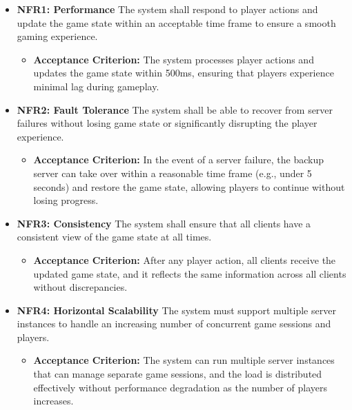 \documentclass{scrartcl}
\begin{document}
%
\begin{itemize}
  \item \textbf{NFR1: Performance} \newline
  The system shall respond to player actions and update the game state within an acceptable time frame to ensure a smooth gaming experience.
  \begin{itemize}
    \item \textbf{Acceptance Criterion:} The system processes player actions and updates the game state within 500ms, ensuring that players experience minimal lag during gameplay.
  \end{itemize}

  \item \textbf{NFR2: Fault Tolerance} \newline
  The system shall be able to recover from server failures without losing game state or significantly disrupting the player experience.
  \begin{itemize}
    \item \textbf{Acceptance Criterion:} In the event of a server failure, the backup server can take over within a reasonable time frame (e.g., under 5 seconds) and restore the game state, allowing players to continue without losing progress.
  \end{itemize}

  \item \textbf{NFR3: Consistency} \newline
  The system shall ensure that all clients have a consistent view of the game state at all times.
  \begin{itemize}
    \item \textbf{Acceptance Criterion:} After any player action, all clients receive the updated game state, and it reflects the same information across all clients without discrepancies.
  \end{itemize}

  \item \textbf{NFR4: Horizontal Scalability} \newline
  The system must support multiple server instances to handle an increasing number of concurrent game sessions and players.
  \begin{itemize}
    \item \textbf{Acceptance Criterion:} The system can run multiple server instances that can manage separate game sessions, and the load is distributed effectively without performance degradation as the number of players increases.
  \end{itemize}

\end{itemize}
\end{document}
